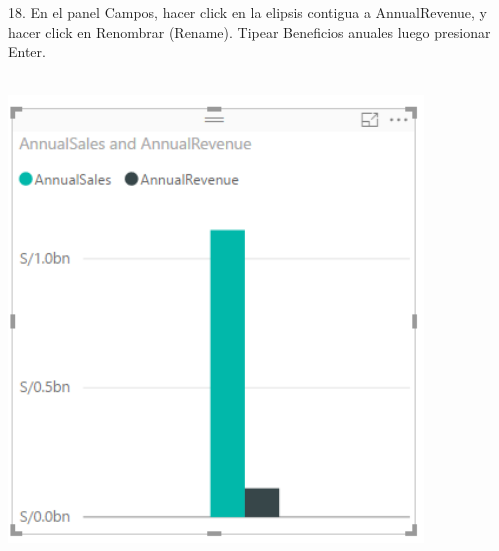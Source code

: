\documentclass[12pt,letterpaper]{article}
\begin{document}
18. En el panel Campos, hacer click en la elipsis contigua a AnnualRevenue, y hacer click en Renombrar
(Rename). Tipear Beneficios anuales luego presionar Enter.\\\\
\begin{center}
\includegraphics[width=11cm]{IMG/34.png} 
\end{center}
\end{document}
